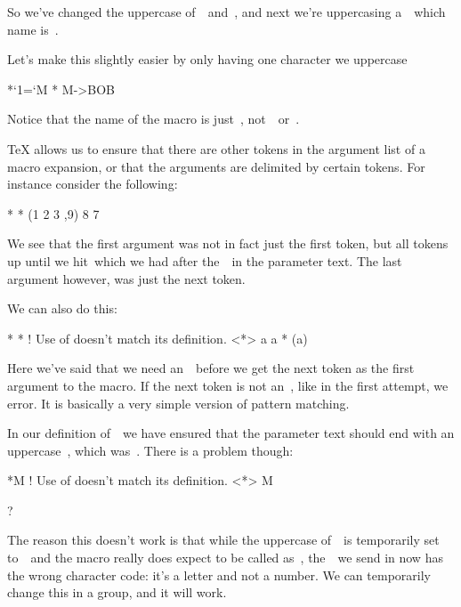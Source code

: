 {{So we've changed the uppercase of~~and~, and next we're
uppercasing a~~which name is~.

Let's make this slightly easier by only having one character we
uppercase

\starttyping
*{\uccode`1=`M \uppercase{\gdef\bob1{bob}}}
*\bob
\bob M->BOB
\stoptyping

Notice that the name of the macro is just~\type{\bob},
not~\type{\bob1}~or~\type{\bobM}.

\startsectionlevel[title={A note about more advanced parameter
texts},reference={a-note-about-more-advanced-parameter-texts}]

TeX allows us to ensure that there are other tokens in the argument list
of a macro expansion, or that the arguments are delimited by certain
tokens. For instance consider the following:

\starttyping
*\def\commasep#1,#2{(#1, #2)}
*\message{\commasep 1 2 3 , 9 8 7}
(1 2 3 ,9) 8 7
\stoptyping

We see that the first argument was not in fact just the first token, but
all tokens up until we hit~\type{,}which we had after the~~in
the parameter text. The last argument however, was just the next token.

We can also do this:

\starttyping
*\def\mfirst m#1{(#1)}
*
! Use of \mfirst doesn't match its definition.
<*> \mfirst a
              a
*\message{\mfirst m a}
(a)
\stoptyping

Here we've said that we need an~~before we get the next token as
the first argument to the macro. If the next token is not an~,
like in the first attempt, we error. It is basically a very simple
version of pattern matching.

\stopsectionlevel

\startsectionlevel[title={Back to Bob},reference={back-to-bob}]

In our definition of~\type{\bob}~we have ensured that the parameter text
should end with an uppercase~, which was~. There is a
problem though:

\starttyping
*\bob M
! Use of \bob doesn't match its definition.
<*> \bob M

?
\stoptyping

The reason this doesn't work is that while the uppercase of~~is
temporarily set to~~and the macro really does expect to be
called as~, the~~we send in now has the wrong
character code: it's a letter and not a number. We can temporarily
change this in a group, and it will work.

}}
